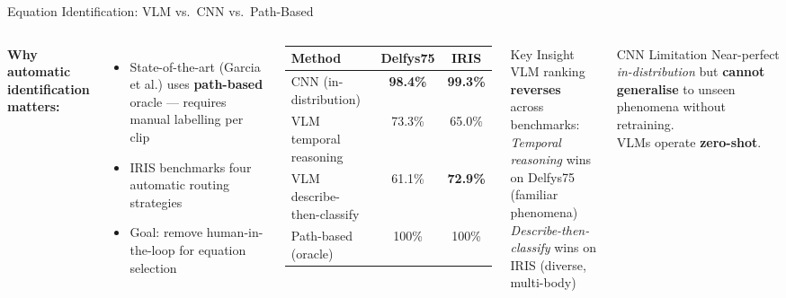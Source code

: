 \documentclass[aspectratio=169,12pt]{beamer}
\newcommand{\highlight}[1]{\textcolor{irisblue}{\textbf{#1}}}
\newcommand{\bad}[1]{\textcolor{irisred}{\textbf{#1}}}
\newcommand{\good}[1]{\textcolor{irisgreen}{\textbf{#1}}}
\begin{document}
\begin{frame}{Equation Identification: VLM vs.\ CNN vs.\ Path-Based}
  \begin{columns}[T]
      \textbf{Why automatic identification matters:}
      \begin{itemize}\setlength\itemsep{0.3em}
        \item State-of-the-art (Garcia et al.) uses \bad{path-based} oracle — requires manual labelling per clip
        \item IRIS benchmarks four automatic routing strategies
        \item Goal: remove human-in-the-loop for equation selection
      \end{itemize}
      \vspace{0.7em}
      \begin{tabular}{lcc}
        \toprule
        \textbf{Method} & \textbf{Delfys75} & \textbf{IRIS} \\
        \midrule
        CNN (in-distribution)    & \good{98.4\%} & \good{99.3\%} \\
        VLM temporal reasoning   & 73.3\%        & 65.0\% \\
        VLM describe-then-classify & 61.1\%      & \good{72.9\%} \\
        \midrule
        Path-based (oracle)      & 100\%         & 100\% \\
        \bottomrule
      \end{tabular}

      \begin{block}{Key Insight}
        VLM ranking \highlight{reverses} across benchmarks:\\[0.4em]
        \textit{Temporal reasoning} wins on Delfys75 (familiar phenomena)\\[0.3em]
        \textit{Describe-then-classify} wins on IRIS (diverse, multi-body)
      \end{block}
      \vspace{0.5em}
      \begin{block}{CNN Limitation}
        Near-perfect \textit{in-distribution} but \bad{cannot generalise} to unseen phenomena without retraining.\\
        VLMs operate \good{zero-shot}.
      \end{block}
  \end{columns}
\end{frame}
\end{document}
